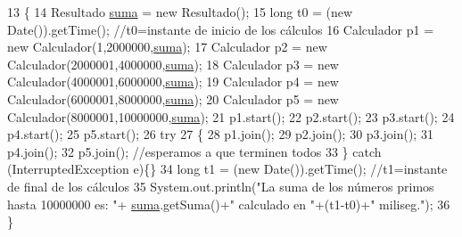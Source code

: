 \begin{DoxyCode}
13     \{      
14         Resultado \mbox{\hyperlink{namespacesuma}{suma}} = \textcolor{keyword}{new} Resultado();
15         \textcolor{keywordtype}{long} t0 = (\textcolor{keyword}{new} Date()).getTime(); \textcolor{comment}{//t0=instante de inicio de los cálculos}
16         Calculador p1 = \textcolor{keyword}{new} Calculador(1,2000000,\mbox{\hyperlink{namespacesuma}{suma}});
17         Calculador p2 = \textcolor{keyword}{new} Calculador(2000001,4000000,\mbox{\hyperlink{namespacesuma}{suma}});
18         Calculador p3 = \textcolor{keyword}{new} Calculador(4000001,6000000,\mbox{\hyperlink{namespacesuma}{suma}});
19         Calculador p4 = \textcolor{keyword}{new} Calculador(6000001,8000000,\mbox{\hyperlink{namespacesuma}{suma}});
20         Calculador p5 = \textcolor{keyword}{new} Calculador(8000001,10000000,\mbox{\hyperlink{namespacesuma}{suma}});
21         p1.start();
22         p2.start();
23         p3.start();
24         p4.start();
25         p5.start();
26         \textcolor{keywordflow}{try}
27         \{
28             p1.join();
29             p2.join();
30             p3.join();
31             p4.join();
32             p5.join(); \textcolor{comment}{//esperamos a que terminen todos}
33         \} \textcolor{keywordflow}{catch} (InterruptedException e)\{\}
34         \textcolor{keywordtype}{long} t1 = (\textcolor{keyword}{new} Date()).getTime(); \textcolor{comment}{//t1=instante de final de los cálculos}
35         System.out.println(\textcolor{stringliteral}{"La suma de los números primos hasta 10000000 es: "}+
      \mbox{\hyperlink{namespacesuma}{suma}}.getSuma()+\textcolor{stringliteral}{" calculado en "}+(t1-t0)+\textcolor{stringliteral}{" miliseg."});
36     \}
\end{DoxyCode}
